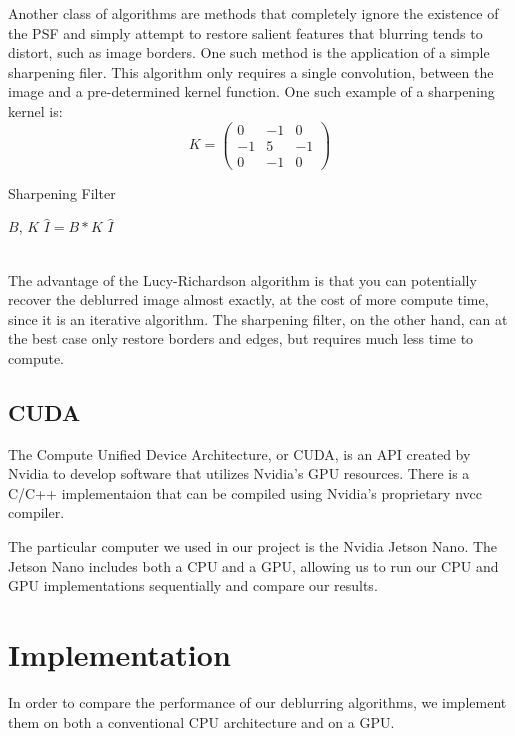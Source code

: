 \documentclass{article}
\begin{document}
Another class of algorithms are methods that completely ignore the existence of the PSF and simply attempt to restore salient features that blurring tends to distort, such as image borders. One such method is the application of a simple sharpening filer. This algorithm only requires a single convolution, between the image and a pre-determined kernel function. One such example of a sharpening kernel is:
\begin{equation}
    K = 
\begin{pmatrix}
0 & -1 & 0 \\
-1 & 5 & -1 \\
0 & -1 & 0
\end{pmatrix}
\end{equation}
\begin{algorithm}
\caption{Sharpening Filter}
\begin{algorithmic} 
\REQUIRE $B$, $K$
    \STATE $\hat{I} = B * K$
    \RETURN $\hat{I}$
\end{algorithmic}
\end{algorithm}\\
The advantage of the Lucy-Richardson algorithm is that you can potentially recover the deblurred image almost exactly, at the cost of more compute time, since it is an iterative algorithm. The sharpening filter, on the other hand, can at the best case only restore borders and edges, but requires much less time to compute. 


\subsection{CUDA}
The Compute Unified Device Architecture, or CUDA, is an API created by Nvidia to develop software that utilizes Nvidia's GPU resources. There is a C/C++ implementaion that can be compiled using Nvidia's proprietary nvcc compiler.

The particular computer we used in our project is the Nvidia Jetson Nano. The Jetson Nano includes both a CPU and a GPU, allowing us to run our CPU and GPU implementations sequentially and compare our results.


\section{Implementation}
In order to compare the performance of our deblurring algorithms, we implement them on both a conventional CPU architecture and on a GPU. 
\end{document}
